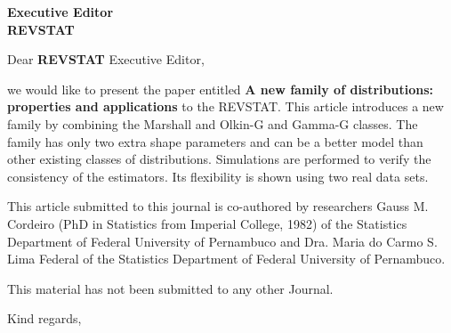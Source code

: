 \documentclass[version=last,12pt,{"/home/prdm0/R/x86_64-pc-linux-gnu-library/4.0/komaletter/rmarkdown/templates/pdf/resources/maintainersDelight"},letterpaper,]{scrlttr2}
\begin{document}
\begin{letter}{\textbf{Executive Editor}\\\textbf{REVSTAT}\\}
\opening{Dear \textbf{REVSTAT} Executive Editor,}

we would like to present the paper entitled \textbf{A new family of
distributions: properties and applications} to the REVSTAT. This article
introduces a new family by combining the Marshall and Olkin-G and
Gamma-G classes. The family has only two extra shape parameters and can
be a better model than other existing classes of distributions.
Simulations are performed to verify the consistency of the estimators.
Its flexibility is shown using two real data sets.

This article submitted to this journal is co-authored by researchers
Gauss M. Cordeiro (PhD in Statistics from Imperial College, 1982) of the
Statistics Department of Federal University of Pernambuco and Dra. Maria
do Carmo S. Lima Federal of the Statistics Department of Federal
University of Pernambuco.

This material has not been submitted to any other Journal.

\closing{Kind regards,}




\end{letter}
\end{document}
